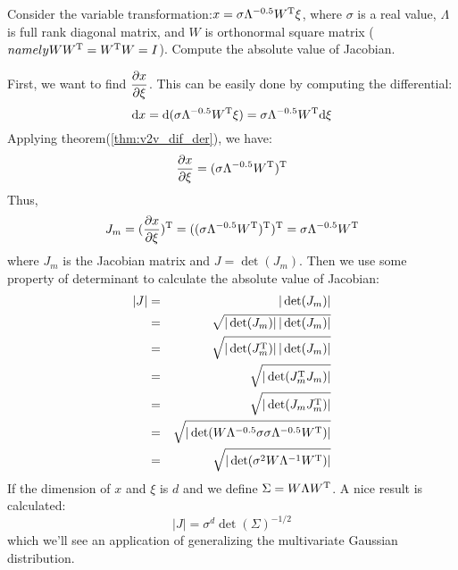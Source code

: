 \begin{myex}
	\label{ex:gaussian_trans}
	Consider the variable transformation:$x = \sigma \Lambda^{-0.5}W^\mathrm{T} \xi$, 
	where $\sigma$ is a real value, $\Lambda$ is full rank diagonal matrix, 
	and $W$ is orthonormal square matrix
	($namely WW^\mathrm{T}=W^\mathrm{T}W = I$). Compute
	the absolute value of Jacobian.  
	
	First, we want to find $\dfrac{\partial x}{\partial \xi}$. This can be easily done 
	by computing the differential:
	\begin{equation}
		\mathrm{d}x = \mathrm{d}(\sigma \Lambda^{-0.5}W^\mathrm{T} \xi) 
		= \sigma \Lambda^{-0.5}W^\mathrm{T} \mathrm{d}\xi
	\end{equation}
	Applying theorem(\ref{thm:v2v_dif_der}), we have:
	\begin{equation}
		\dfrac{\partial x}{\partial \xi} = (\sigma \Lambda^{-0.5}W^\mathrm{T}) ^\mathrm{T}
	\end{equation}
	Thus, 
	\begin{equation}
		J_m = (\dfrac{\partial x}{\partial \xi}) ^\mathrm{T} = ((\sigma \Lambda^{-0.5}W^\mathrm{T}) ^\mathrm{T})^\mathrm{T}
		=\sigma \Lambda^{-0.5}W^\mathrm{T}
	\end{equation}
	where $J_m$ is the Jacobian matrix and $J= \det(J_m)$. Then we use 
	some property of determinant to calculate the absolute value of 
	Jacobian:
	\begin{eqnarray}
		|J| &=& |\det(J_m)| \\
		&=& \sqrt{|\det(J_m)|\,|\det(J_m)|} \\
		&=& \sqrt{|\det(J_m^\mathrm{T})|\,|\det(J_m)|} \\
		&=& \sqrt{|\det(J_m^\mathrm{T}J_m)|} \\
		&=& \sqrt{|\det(J_mJ_m^\mathrm{T})|} \\
		&=& \sqrt{|\det(   W \Lambda^{-0.5}\sigma \sigma \Lambda^{-0.5}W^\mathrm{T}  )|} \\
		&=& \sqrt{|\det( \sigma^2  W \Lambda^{-1}W^\mathrm{T}  )|}
	\end{eqnarray}
	If the dimension of $x$ and $\xi$ is $d$ and we define $\Sigma = W \Lambda W^\mathrm{T}$. 
	A nice result is calculated:
	\begin{equation}
		|J| = \sigma^d \det(\Sigma)^{-1/2}
	\end{equation}
	which we'll see an application of generalizing the multivariate Gaussian distribution. 
\end{myex}

